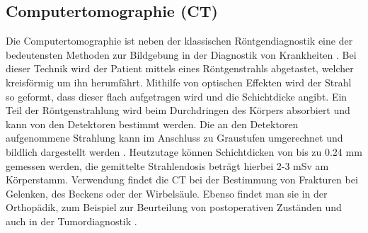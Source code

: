 \subsection{Computertomographie (CT)}
\label{sec:CT}
Die Computertomographie ist neben der klassischen Röntgendiagnostik eine der bedeutensten Methoden zur Bildgebung in der 
Diagnostik von Krankheiten \cite{Artikel3,Artikel4}. Bei dieser Technik wird der Patient mittels eines Röntgenstrahls 
abgetastet, welcher kreisförmig um ihn herumfährt. Mithilfe von optischen Effekten wird der Strahl so geformt, dass dieser flach 
aufgetragen wird und die Schichtdicke angibt. Ein Teil der Röntgenstrahlung wird beim Durchdringen des Körpers absorbiert und kann 
von den Detektoren bestimmt werden. Die an den Detektoren aufgenommene Strahlung kann im Anschluss zu Graustufen umgerechnet und 
bildlich dargestellt werden \cite{Artikel3}. 
Heutzutage können Schichtdicken von bis zu 0.24 mm gemessen werden, die gemittelte Strahlendosis beträgt hierbei 2-3 mSv am Körperstamm.
Verwendung findet die CT bei der Bestimmung von Frakturen bei Gelenken, des Beckens oder der Wirbelsäule. Ebenso findet man sie 
in der Orthopädik, zum Beispiel zur Beurteilung von postoperativen Zuständen und auch in der Tumordiagnostik \cite{Artikel4}.






